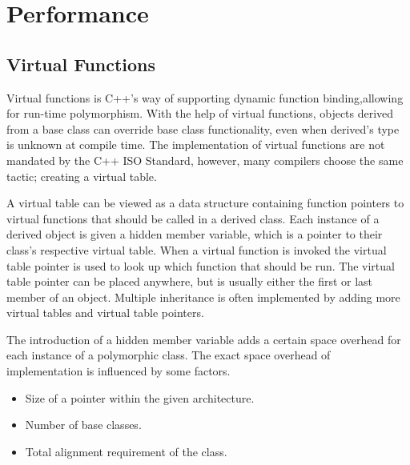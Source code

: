 \section{Performance}

\subsection{Virtual Functions}
Virtual functions is C++'s way of supporting dynamic function binding,allowing for run-time polymorphism.
With the help of virtual functions, objects derived from a base class can override base class functionality,
even when derived's type is unknown at compile time.
The implementation of virtual functions are not mandated by the C++ ISO Standard,
however, many compilers choose the same tactic; creating a virtual table.\cite{wikipedia_virtual_method_table}

A virtual table can be viewed as a data structure containing function pointers to virtual functions that should be called in a derived class.
Each instance of a derived object is given a hidden member variable, which is a pointer to their class's respective virtual table.
When a virtual function is invoked the virtual table pointer is used to look up which function that should be run.
The virtual table pointer can be placed anywhere, but is usually either the first or last member of an object.
Multiple inheritance is often implemented by adding more virtual tables and virtual table pointers.\cite{codersource_virtual_functions}

The introduction of a hidden member variable adds a certain space overhead for each instance of a polymorphic class.
The exact space overhead of implementation is influenced by some factors.
\begin{itemize}
    \item
    Size of a pointer within the given architecture.

    \item
    Number of base classes.

    \item
    Total alignment requirement of the class.
\end{itemize}

